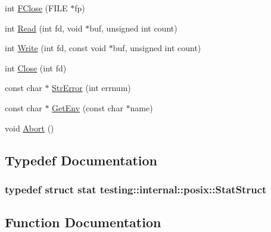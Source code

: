 \begin{DoxyCompactItemize}
\item 
int \hyperlink{namespacetesting_1_1internal_1_1posix_af4beeaaa8d62916d5e3b644a1ddfbd6b}{F\+Close} (F\+I\+L\+E $\ast$fp)
\item 
int \hyperlink{namespacetesting_1_1internal_1_1posix_a3c6ab13e581a56f1b02f3eb7536c97fd}{Read} (int fd, void $\ast$buf, unsigned int count)
\item 
int \hyperlink{namespacetesting_1_1internal_1_1posix_af4acf9f78d55f815a18b43786511abef}{Write} (int fd, const void $\ast$buf, unsigned int count)
\item 
int \hyperlink{namespacetesting_1_1internal_1_1posix_a15e5b8f2a535ef1b2529b85b861e4846}{Close} (int fd)
\item 
const char $\ast$ \hyperlink{namespacetesting_1_1internal_1_1posix_a4b77b14af6f4d18f83d303b98e9349c4}{Str\+Error} (int errnum)
\item 
const char $\ast$ \hyperlink{namespacetesting_1_1internal_1_1posix_a1d5e3da5a27eed25986859fa83cafe95}{Get\+Env} (const char $\ast$name)
\item 
void \hyperlink{namespacetesting_1_1internal_1_1posix_a69b8278c59359dd6a6f941b4643db9fb}{Abort} ()
\end{DoxyCompactItemize}


\subsection{Typedef Documentation}
\hypertarget{namespacetesting_1_1internal_1_1posix_a8eb9f08d3af29941c2d2a964cfff3ecb}{}
\subsubsection[{Stat\+Struct}]{\setlength{\rightskip}{0pt plus 5cm}typedef struct stat {\bf testing\+::internal\+::posix\+::\+Stat\+Struct}}\label{namespacetesting_1_1internal_1_1posix_a8eb9f08d3af29941c2d2a964cfff3ecb}


\subsection{Function Documentation}
\hypertarget{namespacetesting_1_1internal_1_1posix_a69b8278c59359dd6a6f941b4643db9fb}{}
